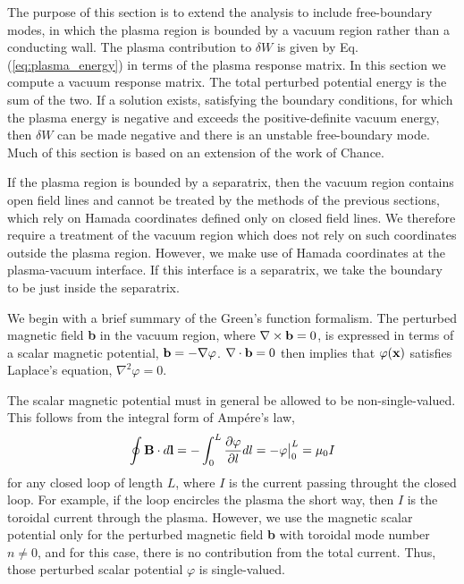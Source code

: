 \documentclass[prb,twocolumn,showpacs,preprintnumbers,amsmath,amssymb]{revtex4}
\renewcommand*{\v}[1]{\hbox{\bfseries #1}}
\begin{document}
The purpose of this section is to extend the analysis to include
free-boundary modes, in which the plasma region is bounded by a vacuum
region rather than a conducting wall.  The plasma contribution to
$\delta W$ is given by Eq. (\ref{eq:plasma_energy}) in terms of the
plasma response matrix.  In this section we compute a vacuum response
matrix.  The total perturbed potential energy is the sum of the two.  If
a solution exists, satisfying the boundary conditions, for which the
plasma energy is negative and exceeds the positive-definite vacuum
energy, then $\delta W$ can be made negative and there is an unstable
free-boundary mode.  Much of this section is based on an extension of
the work of Chance.\cite{msc97}

If the plasma region is bounded by a separatrix, then the vacuum region
contains open field lines and cannot be treated by the methods of the
previous sections, which rely on Hamada coordinates defined only on
closed field lines.  We therefore require a treatment of the vacuum
region which does not rely on such coordinates outside the plasma
region.  However, we make use of Hamada coordinates at the plasma-vacuum
interface.  If this interface is a separatrix, we take the boundary to
be just inside the separatrix.

We begin with a brief summary of the Green's function formalism.  The
perturbed magnetic field \v{b} in the vacuum region, where $\nabla
\times \v{b} = 0$, is expressed in terms of a scalar magnetic potential,
$\v{b} = - \nabla \varphi$.  $\nabla \cdot \v{b} =0$ then implies that
$\varphi(\v{x})$ satisfies Laplace's equation, $\nabla^2 \varphi = 0$.

The scalar magnetic potential must in general be allowed to be
non-single-valued.  This follows from the integral form of Amp\'ere's
law,
\[
\oint \v{B} \cdot d\v{l} 
	= - \int_0^L \frac{\partial \varphi}{\partial l} dl
	= - \varphi \big |_0^L = \mu_0 I
\]
for any closed loop of length $L$, where $I$ is the current passing
throught the closed loop.  For example, if the loop encircles the plasma
the short way, then $I$ is the toroidal current through the plasma.
However, we use the magnetic scalar potential only for the perturbed
magnetic field \v{b} with toroidal mode number $n \ne 0$, and for this
case, there is no contribution from the total current.\cite{rcg76} Thus,
those perturbed scalar potential $\varphi$ is single-valued.
\end{document}

